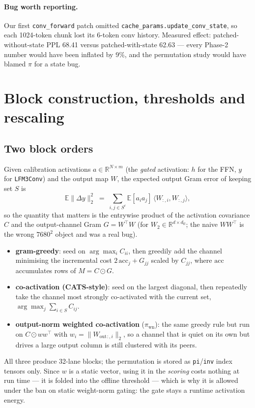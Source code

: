 \documentclass[11pt]{article}
\newcommand{\dff}{\ensuremath{d_{\mathrm{ff}}}}
\newcommand{\Wout}{\ensuremath{W_{\mathrm{out}}}}
\newcommand{\code}[1]{\texttt{\small #1}}
\newcommand{\piwn}{\pi_{\mathrm{wn}}}
\begin{document}
\paragraph{Bug worth reporting.} Our first \code{conv\_forward} patch omitted
\code{cache\_params.update\_conv\_state}, so each 1024-token chunk lost its 6-token conv
history. Measured effect: patched-without-state PPL 68.41 versus patched-with-state 62.63
--- every Phase-2 number would have been inflated by 9\%, and the permutation study would
have blamed $\pi$ for a state bug. \label{sec:bug}

\section{Block construction, thresholds and rescaling}

\subsection{Two block orders}
Given calibration activations $a\in\mathbb{R}^{N\times m}$ (the \emph{gated} activation:
$h$ for the FFN, $y$ for \code{LFM3Conv}) and the output map $W$, the expected output
Gram error of keeping set $S$ is
\begin{equation}
\mathbb{E}\|\Delta y\|_2^2 \;=\; \sum_{i,j\in S^{c}} \mathbb{E}[a_ia_j]\,
\langle W_{:,i}, W_{:,j}\rangle , \label{eq:gram}
\end{equation}
so the quantity that matters is the entrywise product of the activation covariance $C$
and the output-channel Gram $G = W^{\!\top}W$ (for $W_2\in\mathbb{R}^{d\times\dff}$; the
naive $WW^{\!\top}$ is the wrong $7680^2$ object and was a real bug).
\begin{itemize}
\item \textbf{gram-greedy}: seed on $\arg\max_i C_{ii}$, then greedily add the channel
minimising the incremental cost $2\,\mathrm{acc}_j + G_{jj}$ scaled by $C_{jj}$, where
$\mathrm{acc}$ accumulates rows of $M=C\odot G$.
\item \textbf{co-activation (CATS-style)}: seed on the largest diagonal, then repeatedly
take the channel most strongly co-activated with the current set,
$\arg\max_j \sum_{i\in S} C_{ij}$.
\item \textbf{output-norm weighted co-activation} ($\piwn$): the same greedy rule but run
on $C\odot ww^{\!\top}$ with $w_i=\|\Wout{}_{:,i}\|_2$, so a channel that is quiet on its own
but drives a large output column is still clustered with its peers.
\end{itemize}
All three produce 32-lane blocks; the permutation is stored as \code{pi}/\code{inv} index
tensors only. Since $w$ is a static vector, using it in the \emph{scoring} costs nothing at
run time --- it is folded into the offline threshold --- which is why it is allowed under
the ban on static weight-norm gating: the gate stays a runtime activation energy.
\end{document}
